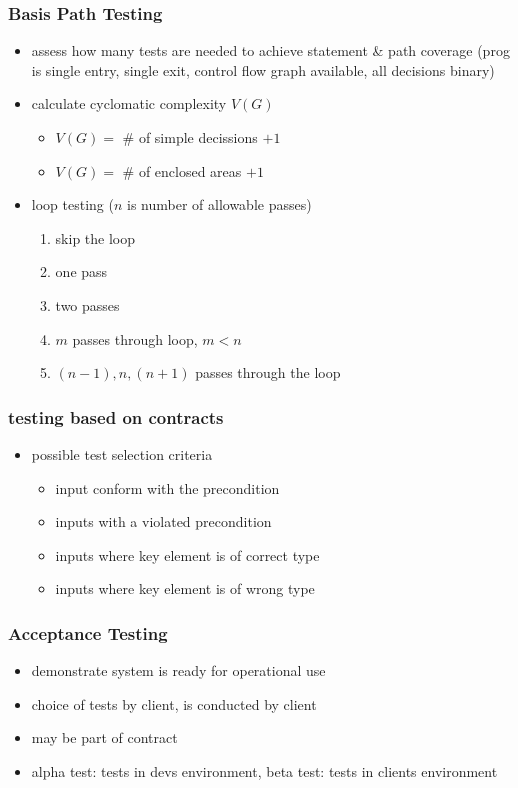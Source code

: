 \documentclass[a4paper, 10pt]{article}
\begin{document}
\subsubsection*{Basis Path Testing}
\begin{itemize}
	\item assess how many tests are needed to achieve statement \& path coverage (prog is single entry, single exit, control flow graph available, all decisions binary)
	\item calculate cyclomatic complexity $V(G)$
	\begin{itemize}
		\item $V(G)=$ \# of simple decissions $+1$
		\item $V(G)=$ \# of enclosed areas $+1$
	\end{itemize}
	\item loop testing ($n$ is number of allowable passes)
	\begin{enumerate}
		\item skip the loop
		\item one pass
		\item two passes
		\item $m$ passes through loop, $m<n$
		\item $(n-1), n, (n+1)$ passes through the loop
	\end{enumerate}
\end{itemize}

\subsubsection*{testing based on contracts}
\begin{itemize}
	\item possible test selection criteria
	\begin{itemize}
		\item input conform with the precondition
		\item inputs with a violated precondition
		\item inputs where key element is of correct type
		\item inputs where key element is of wrong type
	\end{itemize}
\end{itemize}

\subsubsection*{Acceptance Testing}
\begin{itemize}
	\item demonstrate system is ready for operational use
	\item choice of tests by client, is conducted by client
	\item may be part of contract
	\item alpha test: tests in devs environment, beta test: tests in clients environment
\end{itemize}
\end{document}
